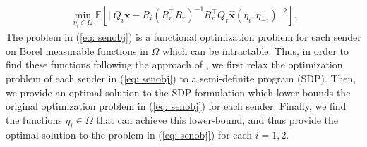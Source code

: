\documentclass[12pt,journal,onecolumn]{IEEEtran}
\begin{document}
\begin{align}
    \min_{\eta_i\in\Omega} \mathbb{E}[||Q_i\boldsymbol{x}-R_i(R_r^\top R_r)^{-1}R_r^\top Q_r\hat{\boldsymbol{x}}(\eta_i,\eta_{-i})||^2].\label{eq: senobj}
\end{align}
The problem in (\ref{eq: senobj}) is a functional optimization problem for each sender on Borel measurable functions in $\Omega$ which %
can be intractable. %
Thus, in order to find these functions following the approach of \cite{sayin2019hierarchical,tamura2018bayesian}, we first relax the optimization problem of each sender in (\ref{eq: senobj}) to a semi-definite program (SDP). Then, we provide an optimal solution to the SDP formulation which lower bounds the original optimization problem in (\ref{eq: senobj}) for each sender. Finally, we find the functions $\eta_i\in\Omega$ that can achieve this lower-bound, and thus provide the optimal solution to the problem in (\ref{eq: senobj}) for each $i=1,2$.
\end{document}

